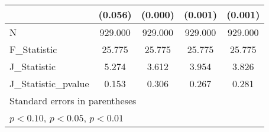 {\begin{tabular}{l*{4}{c}}
            &     (0.056)         &     (0.000)         &     (0.001)         &     (0.001)         \\
\hline
N           &     929.000         &     929.000         &     929.000         &     929.000         \\
F\_Statistic &      25.775         &      25.775         &      25.775         &      25.775         \\
J\_Statistic &       5.274         &       3.612         &       3.954         &       3.826         \\
J\_Statistic\_pvalue&       0.153         &       0.306         &       0.267         &       0.281         \\
\hline\hline
\multicolumn{5}{l}{\footnotesize Standard errors in parentheses}\\
\multicolumn{5}{l}{\footnotesize \sym{*} \(p<0.10\), \sym{**} \(p<0.05\), \sym{***} \(p<0.01\)}\\
\end{tabular}
}
